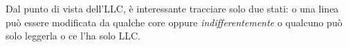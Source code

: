 \noindent Dal punto di vista dell'LLC, è interessante tracciare solo due stati: o una linea può essere modificata da qualche core oppure \textit{indifferentemente} o qualcuno può solo leggerla o ce l'ha solo LLC. 

\begin{figure}[ht]
    \centering
    \setlength{\fboxrule}{0.5pt} %
    \setlength{\fboxsep}{0pt}    %
\end{figure}

